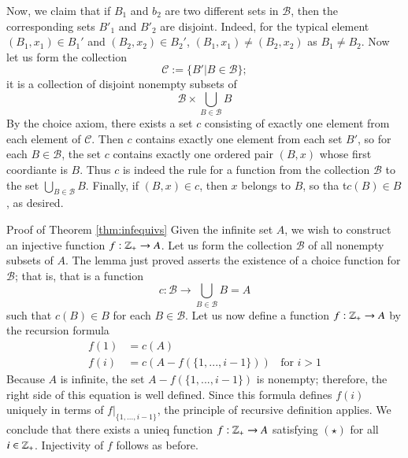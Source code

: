 \documentclass[12pt, a4paper, twoside, openright, titlepage]{book}
\begin{document}
\begin{appendices}
\begin{proof*}{}{}
        Now, we claim that if $B_1$ and $b_2$ are two different sets in $\mathscr{B}$, then the corresponding sets $B'_1$ and $B'_2$ are disjoint. Indeed, for the typical element $(B_1,x_1) \in B_1'$ and $(B_2,x_2) \in B_2'$, $(B_1,x_1) \neq (B_2,x_2)$ as $B_1 \neq B_2$. Now let us form the collection \begin{equation*}
            \mathscr{C} :=\{B'\vert B \in \mathscr{B}\};
        \end{equation*}
        it is a collection of disjoint nonempty subsets of \begin{equation*}
            \mathscr{B}\times \bigcup\limits_{B\in \mathscr{B}}B
        \end{equation*}
        By the choice axiom, there exists a set $c$ consisting of exactly one element from each element of $\mathscr{C}$. Then $c$ contains exactly one element from each set $B'$, so for each $B \in \mathscr{B}$, the set $c$ contains exactly one ordered pair $(B,x)$ whose first coordiante is $B$. Thus $c$ is indeed the rule for a function from the collection $\mathscr{B}$ to the set $\bigcup_{B\in\mathscr{B}}B$. Finally, if $(B,x) \in c$, then $x$ belongs to $B$, so tha t$c(B) \in B$, as desired.
    \end{proof*}




    \begin{proof*}{Proof of Theorem \ref{thm:infequivs}}{}
        Given the infinite set $A$, we wish to construct an injective function $f:\mathbb Z_+\rightarrow A$. Let us form the collection $\mathscr{B}$ of all nonempty subsets of $A$. The lemma just proved asserts the existence of a choice function for $\mathscr{B}$; that is, that is a function \begin{equation*}
            c:\mathscr{B}\rightarrow \bigcup\limits_{B\in\mathscr{B}}B = A
        \end{equation*}
        such that $c(B) \in B$ for each $B \in \mathscr{B}$. Let us now define a function $f:\mathbb Z_+\rightarrow A$ by the recursion formula \begin{align*}
            f(1) &= c(A) \\
            f(i) &= c(A-f(\{1,...,i-1\}))\;\;\text{ for } i >1
        \end{align*}
        Because $A$ is infinite, the set $A-f(\{1,...,i-1\})$ is nonempty; therefore, the right side of this equation is well defined. Since this formula defines $f(i)$ uniquely in terms of $f\rvert_{\{1,...,i-1\}}$, the principle of recursive definition applies. We conclude that there exists a unieq function $f:\mathbb Z_+\rightarrow A$ satisfying $(\star)$ for all $i \in \mathbb Z_+$. Injectivity of $f$ follows as before.
    \end{proof*}




\end{appendices}
\end{document}

